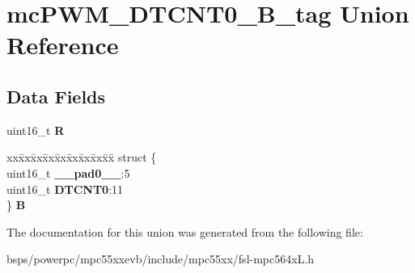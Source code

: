 \hypertarget{unionmcPWM__DTCNT0__16B__tag}{}\section{mc\+P\+W\+M\+\_\+\+D\+T\+C\+N\+T0\+\_\+B\+\_\+tag Union Reference}
\label{unionmcPWM__DTCNT0__16B__tag}
\subsection*{Data Fields}
\begin{DoxyCompactItemize}
\item 
\mbox{\label{unionmcPWM__DTCNT0__16B__tag_a1e0035e5c0c8ad21b69d4ab8efe1fb4e}} 
uint16\+\_\+t {\bfseries R}
\item 
\mbox{\label{unionmcPWM__DTCNT0__16B__tag_adf1b1f7d096b36194e9a958340a5b8ac}} 
\begin{tabbing}
xx\=xx\=xx\=xx\=xx\=xx\=xx\=xx\=xx\=\kill
struct \{\\
\>uint16\_t {\bfseries \_\_pad0\_\_}:5\\
\>uint16\_t {\bfseries DTCNT0}:11\\
\} {\bfseries B}\\

\end{tabbing}\end{DoxyCompactItemize}


The documentation for this union was generated from the following file\+:\begin{DoxyCompactItemize}
\item 
bsps/powerpc/mpc55xxevb/include/mpc55xx/fsl-\/mpc564x\+L.\+h\end{DoxyCompactItemize}
